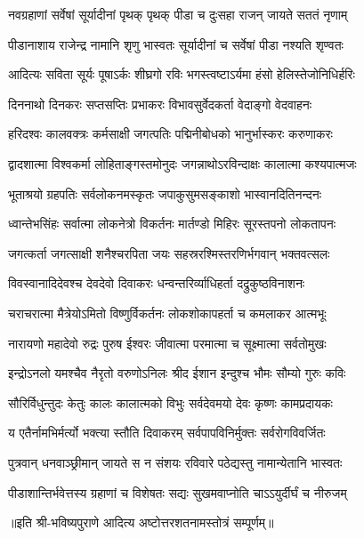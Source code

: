 

\twolineshloka
{नवग्रहाणां सर्वेषां सूर्यादीनां पृथक् पृथक्}
{पीडा च दुःसहा राजन् जायते सततं नृणाम्}

\twolineshloka
{पीडानाशाय राजेन्द्र नामानि शृणु भास्वतः}
{सूर्यादीनां च सर्वेषां पीडा नश्यति शृण्वतः}

\twolineshloka
{आदित्यः सविता सूर्यः पूषाऽर्कः शीघ्रगो रविः}
{भगस्त्वष्टाऽर्यमा हंसो हेलिस्तेजोनिधिर्हरिः}

\twolineshloka
{दिननाथो दिनकरः सप्तसप्तिः प्रभाकरः}
{विभावसुर्वेदकर्ता वेदाङ्गो वेदवाहनः}

\twolineshloka
{हरिदश्वः कालवक्त्रः कर्मसाक्षी जगत्पतिः}
{पद्मिनीबोधको भानुर्भास्करः करुणाकरः}

\twolineshloka
{द्वादशात्मा विश्वकर्मा लोहिताङ्गस्तमोनुदः}
{जगन्नाथोऽरविन्दाक्षः कालात्मा कश्यपात्मजः}

\twolineshloka
{भूताश्रयो ग्रहपतिः सर्वलोकनमस्कृतः}
{जपाकुसुमसङ्काशो भास्वानदितिनन्दनः}

\twolineshloka
{ध्वान्तेभसिंहः सर्वात्मा लोकनेत्रो विकर्तनः}
{मार्तण्डो मिहिरः सूरस्तपनो लोकतापनः}

\twolineshloka
{जगत्कर्ता जगत्साक्षी शनैश्चरपिता जयः}
{सहस्ररश्मिस्तरणिर्भगवान् भक्तवत्सलः}

\twolineshloka
{विवस्वानादिदेवश्च देवदेवो दिवाकरः}
{धन्वन्तरिर्व्याधिहर्ता दद्रुकुष्ठविनाशनः}

\twolineshloka
{चराचरात्मा मैत्रेयोऽमितो विष्णुर्विकर्तनः}
{लोकशोकापहर्ता च कमलाकर आत्मभूः}

\twolineshloka
{नारायणो महादेवो रुद्रः पुरुष ईश्वरः}
{जीवात्मा परमात्मा च सूक्ष्मात्मा सर्वतोमुखः}

\twolineshloka
{इन्द्रोऽनलो यमश्चैव नैरृतो वरुणोऽनिलः}
{श्रीद ईशान इन्दुश्च भौमः सौम्यो गुरुः कविः}

\twolineshloka
{सौरिर्विधुन्तुदः केतुः कालः कालात्मको विभुः}
{सर्वदेवमयो देवः कृष्णः कामप्रदायकः}

\twolineshloka
{य एतैर्नामभिर्मर्त्यो भक्त्या स्तौति दिवाकरम्}
{सर्वपापविनिर्मुक्तः सर्वरोगविवर्जितः}

\twolineshloka
{पुत्रवान् धनवाञ्छ्रीमान् जायते स न संशयः}
{रविवारे पठेद्यस्तु नामान्येतानि भास्वतः}

\twolineshloka
{पीडाशान्तिर्भवेत्तस्य ग्रहाणां च विशेषतः}
{सद्यः सुखमवाप्नोति चाऽऽयुर्दीर्घं च नीरुजम्}

॥इति श्री-भविष्यपुराणे आदित्य अष्टोत्तरशतनामस्तोत्रं सम्पूर्णम्॥